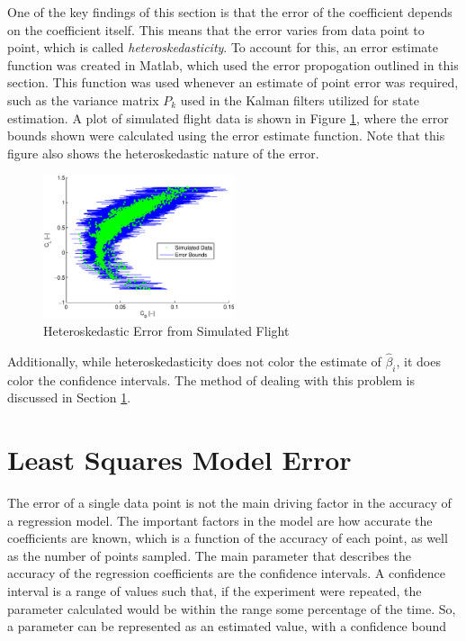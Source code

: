 \documentclass[12pt]{ucthesis}
\begin{document}
One of the key findings of this section is that the error of the coefficient depends on the coefficient itself. This means that the error varies from data point to point, which is called \textit{heteroskedasticity}. To account for this, an error estimate function was created in Matlab, which used the error propogation outlined in this section. This function was used whenever an estimate of point error was required, such as the variance matrix $P_k$ used in the Kalman filters utilized for state estimation. A plot of simulated flight data is shown in Figure \ref{errorBndFigure}, where the error bounds shown were calculated using the error estimate function. Note that this figure also shows the heteroskedastic nature of the error.

\begin{figure}[h!]
  \caption{Heteroskedastic Error from Simulated Flight} \label{errorBndFigure}
  \centering
    \includegraphics[width=0.5\textwidth]{figures/heteroskedasticity.eps}
\end{figure}

Additionally, while heteroskedasticity does not color the estimate of $\hat{\beta}_i$, it does color the confidence intervals. The method of dealing with this problem is discussed in Section \ref{leastSquaresError}.


\section{Least Squares Model Error}
\label{leastSquaresError}
The error of a single data point is not the main driving factor in the accuracy of a regression model. The important factors in the model are how accurate the coefficients are known, which is a function of the accuracy of each point, as well as the number of points sampled. The main parameter that describes the accuracy of the regression coefficients are the confidence intervals. A confidence interval is a range of values such that, if the experiment were repeated, the parameter calculated would be within the range some percentage of the time. So, a parameter can be represented as an estimated value, with a confidence bound
\end{document}
